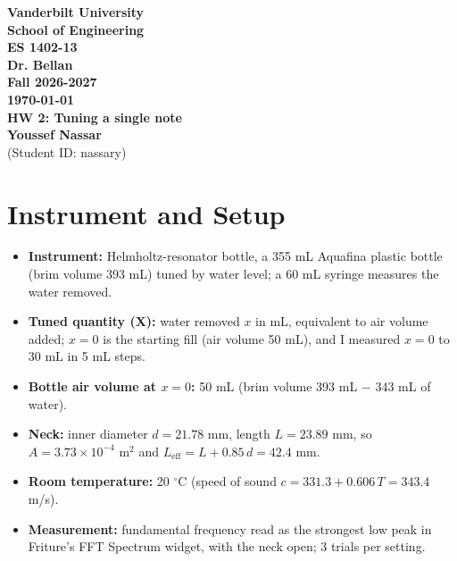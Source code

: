 \documentclass[12pt]{article}
\newcommand{\hwTitle}{Tuning a single note}
\begin{document}
\begin{center}
    \vspace*{2cm}
    \textbf{Vanderbilt University \\}
    \textbf{School of Engineering \\}
    \vfill
    \textbf{ES 1402-13 \\}
    \textbf{Dr. Bellan\\}
    \textbf{Fall 2026-2027\\}
    \textbf{\today \\}
    \textbf{HW 2: \hwTitle \\}
    \vfill
    \textbf{Youssef Nassar \\}
    (Student ID: nassary) \\
    \vfill
\end{center}

\thispagestyle{empty}
\newpage
{}

\fancyhead[C]{\textbf{\hwTitle\ \hwNumber}}

\section*{Instrument and Setup}

\begin{itemize}[itemsep=0.6em]
    \item \textbf{Instrument:} Helmholtz-resonator bottle, a 355 mL Aquafina plastic bottle (brim volume 393 mL) tuned by water level; a 60 mL syringe measures the water removed.
    \item \textbf{Tuned quantity (X):} water removed $x$ in mL, equivalent to air volume added; $x = 0$ is the starting fill (air volume 50 mL), and I measured $x = 0$ to $30$ mL in 5 mL steps.
    \item \textbf{Bottle air volume at $x=0$:} 50 mL \quad (brim volume 393 mL $-$ 343 mL of water).
    \item \textbf{Neck:} inner diameter $d = 21.78$ mm, length $L = 23.89$ mm, so $A = 3.73\times10^{-4}$ m$^2$ and $L_\mathrm{eff} = L + 0.85\,d = 42.4$ mm.
    \item \textbf{Room temperature:} 20 $^{\circ}$C \quad (speed of sound $c = 331.3 + 0.606\,T = 343.4$ m/s).
    \item \textbf{Measurement:} fundamental frequency read as the strongest low peak in Friture's FFT Spectrum widget, with the neck open; 3 trials per setting.
\end{itemize}
\end{document}
